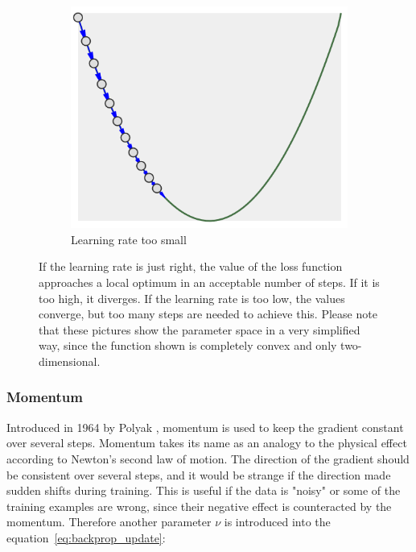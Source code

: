 \begin{figure}
\begin{subfigure}[b]{0.3\textwidth}
        \includegraphics[width=\textwidth]{images/lr_too_low.png}
        \caption{Learning rate too small}
        \label{fig:lr_too-low}
    \end{subfigure}
    \caption{If the learning rate is just right, the value of the loss function approaches a local optimum in an acceptable number of steps.
    If it is too high, it diverges.
    If the learning rate is too low, the values converge, but too many steps are needed to achieve this.
    Please note that these pictures show the parameter space in a very simplified way, since the function shown is completely convex and only two-dimensional.}
    \label{fig:learning_rate}
\end{figure}

\subsubsection{Momentum}

Introduced in 1964 by Polyak \cite{Polyak1964}, momentum is used to keep the gradient constant over several steps.
Momentum takes its name as an analogy to the physical effect according to Newton's second law of motion.
The direction of the gradient should be consistent over several steps, and it would be strange if the direction made sudden shifts during training.
This is useful if the data is "noisy" or some of the training examples are wrong, since their negative effect is counteracted by the momentum.
Therefore another parameter $\nu$ is introduced into the equation~\eqref{eq:backprop_update}:

